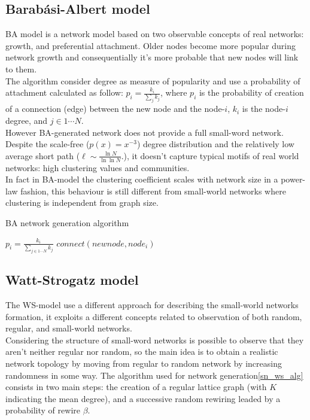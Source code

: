 \subsection{Barabási-Albert model}
\label{sn_ba_model}
BA model\cite{citeulike:90557} is a network model based on two observable concepts of real networks: growth, and preferential attachment. Older nodes become more popular during network growth and consequentially it's more probable that new nodes will link to them.\\
The algorithm consider degree as measure of popularity and use a probability of attachment calculated as follow: $p_{i} = \frac{k_{i}}{\sum_{j} k_{j}}$, where $p_i$ is the probability of creation of a connection (edge) between the new node and the node-$i$, $k_{i}$ is the node-$i$ degree, and $j \in 1 \cdots N$.\\
However BA-generated network does not provide a full small-word network. Despite the scale-free ($p(x)=x^{-3}$) degree distribution and the relatively low average short path ($\ell\sim\frac{\ln N}{\ln \ln N}. $), it doesn't capture typical motifs of real world networks: high clustering values and communities.\\
In fact in BA-model the clustering coefficient scales with network size in a power-law fashion, this behaviour is still different from small-world networks where clustering is independent from graph size.

\begin{algorithm}
\caption{BA network generation algorithm}
\label{sn_ba_alg}
\begin{algorithmic}
	\STATE $p_{i} = \frac{k_{i}}{\sum_{j \in 1\cdots N} k_{j}}$
	 	\STATE $connect(newnode,node_{i})$
 	\ENDIF
\ENDFOR
\end{algorithmic}
\end{algorithm}

\subsection{Watt-Strogatz model}
\label{sn_ws_model}
The WS-model\cite{citeulike:1580006} use a different approach for describing the small-world networks formation, it exploits a different concepts related to observation of both random, regular, and small-world networks.\\
Considering the structure of small-word networks is possible to observe that they aren't neither regular nor random, so the main idea is to obtain a realistic network topology by moving from regular to random network by increasing randomness in some way. The algorithm used for network generation\ref{sn_ws_alg} consists in two main steps: the creation of a regular lattice graph (with $K$ indicating the mean degree), and a successive random rewiring leaded by a probability of rewire $\beta$.

